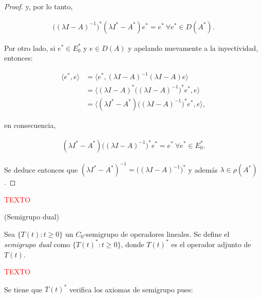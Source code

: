 \begin{proof}
    y, por lo tanto,

    \begin{align*}
        \big( (\lambda I - A)^{-1} \big )^*(\lambda I^* - A^*)e^* = e^* \ \forall e^* \in D(A^*).
    \end{align*}

    Por otro lado, si $e^* \in E_0^*$ y $e \in D(A)$ y apelando nuevamente a la inyectividad, entonces:

    \begin{align*}
        \langle e^*, e \rangle &= \langle e^*, (\lambda I - A)^{-1}(\lambda I - A) e \rangle\\
        &= \Big\langle (\lambda I - A)^* \big( (\lambda I - A)^{-1} \big)^* e^*, e \Big\rangle\\
        &= \Big\langle (\lambda I^* - A^*) \big( (\lambda I - A)^{-1} \big)^* e^*, e \Big\rangle,
    \end{align*}

    en consecuencia,

    \begin{align*}
        (\lambda I^* - A^*)\big( (\lambda I - A)^{-1} \big )^* e^* = e^* \ \forall e^* \in E_0^*.
    \end{align*}

    Se deduce entonces que $(\lambda I^* - A^*)^{-1} = \big((\lambda I - A)^{-1}\big)^*$ y además $\lambda \in \rho(A^*)$.
\end{proof}

\textcolor{red}{TEXTO}\\

\begin{Definicion}{(Semigrupo dual)}
    \label{ch:semigrupos:section:dual:def:sgDual}

    Sea $\{T(t) : t \geq 0\}$ un $C_0$-semigrupo de operadores lineales. Se define el \textit{semigrupo dual} como $\{T(t)^* : t \geq 0\}$, donde $T(t)^*$ es el operador adjunto de $T(t)$.
\end{Definicion}

\textcolor{red}{TEXTO}

Se tiene que $T(t)^*$ verifica los axiomas de semigrupo pues:


